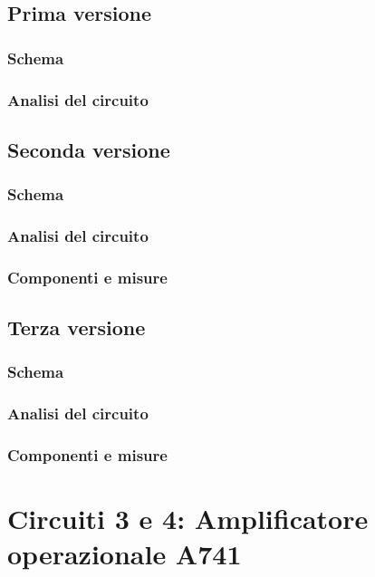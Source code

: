 \section{Prima versione} %
\subsection{Schema} 
\subsection{Analisi del circuito} 
\section{Seconda versione} %
\subsection{Schema} 
\subsection{Analisi del circuito} 
\subsection{Componenti e misure} 
\section{Terza versione} %
\subsection{Schema} 
\subsection{Analisi del circuito} 
\subsection{Componenti e misure} 


\clearpage
\newpage
\chapter{Circuiti 3 e 4: Amplificatore operazionale \textmu A741}
